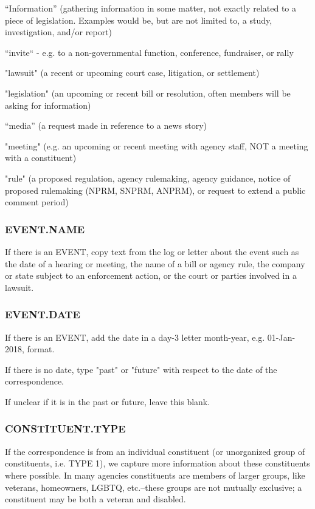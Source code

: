 \documentclass{article}
\begin{document}
“Information” (gathering information in some matter, not exactly related to a piece of legislation. Examples would be, but are not limited to, a 
study, investigation, and/or report)

“invite“ - e.g. to a non-governmental function, conference, fundraiser, or rally

"lawsuit" (a recent or upcoming court case, litigation, or settlement)

"legislation" (an upcoming or recent bill or resolution, often members will be asking for information)

“media” (a request made in reference to a news story)

"meeting" (e.g. an upcoming or recent meeting with agency staff, NOT a meeting with a constituent)

"rule" (a proposed regulation, agency rulemaking, agency guidance, notice of proposed rulemaking (NPRM, SNPRM, ANPRM), or request to extend a public comment period)

\subsubsection{EVENT.NAME}
If there is an EVENT, copy text from the log or letter about the event such as the date of a hearing or meeting, the name of a bill or agency rule, the company or state subject to an enforcement action, or the court or parties involved in a lawsuit. \\
 
\subsubsection{EVENT.DATE}
If there is an EVENT, add the date in a day-3 letter month-year, e.g. 01-Jan-2018, format. 

If there is no date, type "past" or "future"  with respect to the date of the correspondence.

If unclear if it is in the past or future, leave this blank.
 
 
 

\subsubsection{CONSTITUENT.TYPE }
If the correspondence is from an individual constituent (or unorganized group of constituents, i.e. TYPE 1), we capture more information about these constituents where possible. In many agencies constituents are members of larger groups, like veterans, homeowners, LGBTQ, etc.--these groups are not mutually exclusive; a constituent may be both a veteran and disabled. 
 
\end{document}
